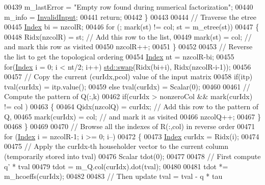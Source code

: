 \begin{DoxyCode}
00439         m\_lastError = \textcolor{stringliteral}{"Empty row found during numerical factorization"};
00440         m\_info = \hyperlink{group__enums_gga85fad7b87587764e5cf6b513a9e0ee5ea945604f62795ffc70aedf2bd12ea0434}{InvalidInput};
00441         \textcolor{keywordflow}{return};
00442       \}
00443 
00444       \textcolor{comment}{// Traverse the etree }
00445       \hyperlink{namespace_eigen_a62e77e0933482dafde8fe197d9a2cfde}{Index} bi = nzcolR;
00446       \textcolor{keywordflow}{for} (; mark(st) != col; st = m\_etree(st))
00447       \{
00448         Ridx(nzcolR) = st;  \textcolor{comment}{// Add this row to the list,}
00449         mark(st) = col;     \textcolor{comment}{// and mark this row as visited}
00450         nzcolR++;
00451       \}
00452 
00453       \textcolor{comment}{// Reverse the list to get the topological ordering}
00454       \hyperlink{namespace_eigen_a62e77e0933482dafde8fe197d9a2cfde}{Index} nt = nzcolR-bi;
00455       \textcolor{keywordflow}{for}(\hyperlink{namespace_eigen_a62e77e0933482dafde8fe197d9a2cfde}{Index} i = 0; i < nt/2; i++) \hyperlink{endian_8c_a3ca5ecd34b04d6a243c054ac3a57f68d}{std::swap}(Ridx(bi+i), Ridx(nzcolR-i-1));
00456        
00457       \textcolor{comment}{// Copy the current (curIdx,pcol) value of the input matrix}
00458       \textcolor{keywordflow}{if}(itp) tval(curIdx) = itp.value();
00459       \textcolor{keywordflow}{else}    tval(curIdx) = Scalar(0);
00460       
00461       \textcolor{comment}{// Compute the pattern of Q(:,k)}
00462       \textcolor{keywordflow}{if}(curIdx > nonzeroCol && mark(curIdx) != col ) 
00463       \{
00464         Qidx(nzcolQ) = curIdx;  \textcolor{comment}{// Add this row to the pattern of Q,}
00465         mark(curIdx) = col;     \textcolor{comment}{// and mark it as visited}
00466         nzcolQ++;
00467       \}
00468     \}
00469 
00470     \textcolor{comment}{// Browse all the indexes of R(:,col) in reverse order}
00471     \textcolor{keywordflow}{for} (\hyperlink{namespace_eigen_a62e77e0933482dafde8fe197d9a2cfde}{Index} i = nzcolR-1; i >= 0; i--)
00472     \{
00473       \hyperlink{namespace_eigen_a62e77e0933482dafde8fe197d9a2cfde}{Index} curIdx = Ridx(i);
00474       
00475       \textcolor{comment}{// Apply the curIdx-th householder vector to the current column (temporarily stored into tval)}
00476       Scalar tdot(0);
00477       
00478       \textcolor{comment}{// First compute q' * tval}
00479       tdot = m\_Q.col(curIdx).dot(tval);
00480 
00481       tdot *= m\_hcoeffs(curIdx);
00482       
00483       \textcolor{comment}{// Then update tval = tval - q * tau}

\end{DoxyCode}
